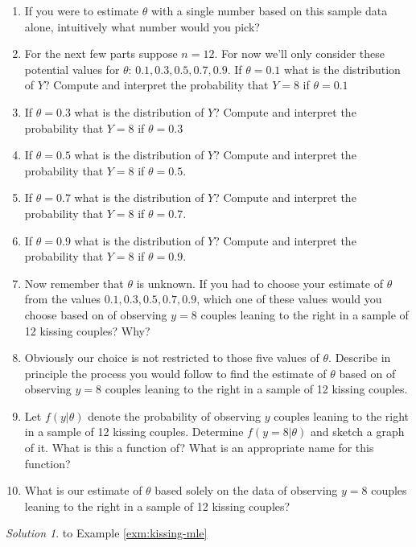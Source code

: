\documentclass[
]{book}
\providecommand{\tightlist}{%
  \setlength{\itemsep}{0pt}\setlength{\parskip}{0pt}}
\theoremstyle{definition}
\theoremstyle{definition}
\theoremstyle{definition}
\theoremstyle{remark}
\newtheorem*{solution}{Solution}
\begin{document}
\begin{enumerate}
\def\labelenumi{\arabic{enumi}.}
\tightlist
\item
  If you were to estimate \(\theta\) with a single number based on this sample data alone, intuitively what number would you pick?
\item
  For the next few parts suppose \(n=12\). For now we'll only consider these potential values for \(\theta\): \(0.1, 0.3, 0.5, 0.7, 0.9\). If \(\theta=0.1\) what is the distribution of \(Y\)? Compute and interpret the probability that \(Y=8\) if \(\theta = 0.1\)
\item
  If \(\theta=0.3\) what is the distribution of \(Y\)? Compute and interpret the probability that \(Y=8\) if \(\theta = 0.3\)
\item
  If \(\theta=0.5\) what is the distribution of \(Y\)? Compute and interpret the probability that \(Y=8\) if \(\theta = 0.5\).
\item
  If \(\theta=0.7\) what is the distribution of \(Y\)? Compute and interpret the probability that \(Y=8\) if \(\theta = 0.7\).
\item
  If \(\theta=0.9\) what is the distribution of \(Y\)? Compute and interpret the probability that \(Y=8\) if \(\theta = 0.9\).
\item
  Now remember that \(\theta\) is unknown. If you had to choose your estimate of \(\theta\) from the values \(0.1, 0.3, 0.5, 0.7, 0.9\), which one of these values would you choose based on of observing \(y=8\) couples leaning to the right in a sample of 12 kissing couples? Why?
\item
  Obviously our choice is not restricted to those five values of \(\theta\). Describe in principle the process you would follow to find the estimate of \(\theta\) based on of observing \(y=8\) couples leaning to the right in a sample of 12 kissing couples.
\item
  Let \(f(y|\theta)\) denote the probability of observing \(y\) couples leaning to the right in a sample of 12 kissing couples. Determine \(f(y=8|\theta)\) and sketch a graph of it. What is this a function of? What is an appropriate name for this function?
\item
  What is our estimate of \(\theta\) based solely on the data of observing \(y=8\) couples leaning to the right in a sample of 12 kissing couples?
\end{enumerate}

\begin{solution}
{}to Example \ref{exm:kissing-mle}
\end{solution}
\end{document}
